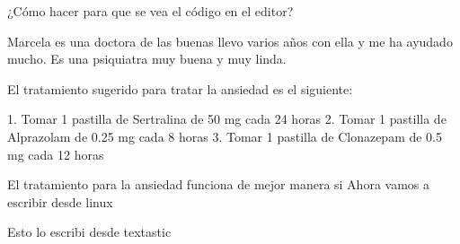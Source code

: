 \documentclass{article}
\begin{document}
¿Cómo hacer para que se vea el código en el editor?


Marcela es una doctora de las buenas llevo varios años con ella y me ha ayudado mucho. Es una psiquiatra muy buena y muy linda.



El tratamiento sugerido para tratar la ansiedad es el siguiente:

1. Tomar 1 pastilla de Sertralina de 50 mg cada 24 horas
2. Tomar 1 pastilla de Alprazolam de 0.25 mg cada 8 horas
3. Tomar 1 pastilla de Clonazepam de 0.5 mg cada 12 horas

El tratamiento para la ansiedad funciona de mejor manera si 
Ahora vamos a escribir desde linux


Esto lo escribi desde textastic
\end{document}

